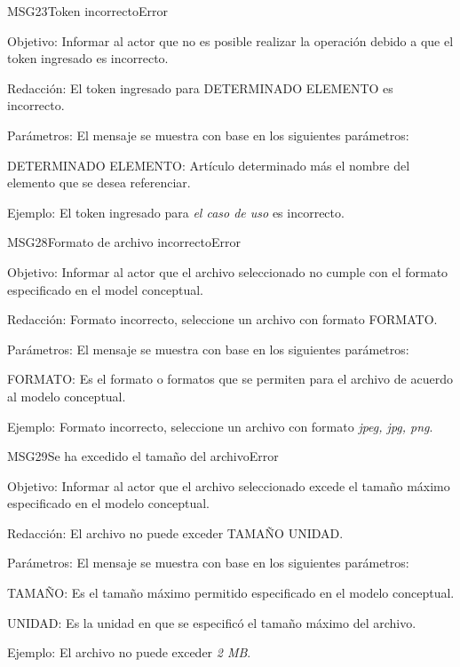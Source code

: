\begin{mensaje}{MSG23}{Token incorrecto}{Error}
    \item[Objetivo:] Informar al actor que no es posible realizar la operación debido a que el token ingresado es incorrecto.
    \item[Redacción:] El token ingresado para DETERMINADO ELEMENTO es incorrecto.
    \item[Parámetros:] El mensaje se muestra con base en los siguientes parámetros:
    \begin{Citemize}
	\item DETERMINADO ELEMENTO: Artículo determinado más el nombre del elemento que se desea referenciar.
    \end{Citemize}
    \item[Ejemplo:] El token ingresado para { \em el caso de uso} es incorrecto.
\end{mensaje}
\begin{mensaje}{MSG28}{Formato de archivo incorrecto}{Error}
    \item[Objetivo:] Informar al actor que el archivo seleccionado no cumple con el formato especificado en el model conceptual.
    \item[Redacción:] Formato incorrecto, seleccione un archivo con formato FORMATO.
    \item[Parámetros:] El mensaje se muestra con base en los siguientes parámetros:
    \begin{Citemize}
	\item FORMATO: Es el formato o formatos que se permiten para el archivo de acuerdo al modelo conceptual.
    \end{Citemize}
    \item[Ejemplo:] Formato incorrecto, seleccione un archivo con formato {\em jpeg, jpg, png}.
\end{mensaje}
\begin{mensaje}{MSG29}{Se ha excedido el tamaño del archivo}{Error}
    \item[Objetivo:] Informar al actor que el archivo seleccionado excede el tamaño máximo especificado en el modelo conceptual.
    \item[Redacción:] El archivo no puede exceder TAMAÑO UNIDAD.
    \item[Parámetros:] El mensaje se muestra con base en los siguientes parámetros:
    \begin{Citemize}
	\item TAMAÑO: Es el tamaño máximo permitido especificado en el modelo conceptual.
	\item UNIDAD: Es la unidad en que se especificó el tamaño máximo del archivo.
    \end{Citemize}
    \item[Ejemplo:] El archivo no puede exceder {\em 2 MB}.
\end{mensaje}


